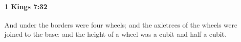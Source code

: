 
		\paragraph{1 Kings 7:32} %
			\label{1KINGS-7-32}

			And under the borders were four wheels; and the axletrees of the wheels were joined to the base: and the height of a wheel was a cubit and half a cubit.


